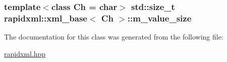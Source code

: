 \subsubsection[{m\+\_\+value\+\_\+size}]{\setlength{\rightskip}{0pt plus 5cm}template$<$class Ch  = char$>$ std\+::size\+\_\+t {\bf rapidxml\+::xml\+\_\+base}$<$ Ch $>$\+::m\+\_\+value\+\_\+size\hspace{0.3cm}{\ttfamily [protected]}}\label{classrapidxml_1_1xml__base_aa3a49d8ceddb8a8d7edb773a2226b89c}


The documentation for this class was generated from the following file\+:\begin{DoxyCompactItemize}
\item 
\hyperlink{rapidxml_8hpp}{rapidxml.\+hpp}\end{DoxyCompactItemize}
